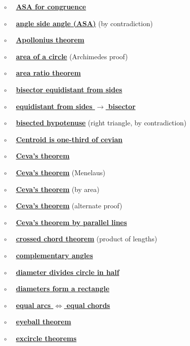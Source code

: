 \documentclass[11pt, oneside]{article}
\begin{document}
$\circ$ \ \ \hyperref[sec:ASA]{\textbf{ASA for congruence}}

$\circ$ \ \ \hyperref[sec:ASA_contradiction]{\textbf{angle side angle (ASA)}} (by contradiction)

$\circ$ \ \ \hyperref[sec:Apollonius_theorem]{\textbf{Apollonius theorem}}

$\circ$ \ \ \hyperref[sec:circle_area_Archimedes]{\textbf{area of a circle}} (Archimedes proof)

$\circ$ \ \ \hyperref[sec:area_ratio_theorem]{\textbf{area ratio theorem}}

$\circ$ \ \ \hyperref[sec:bisector_equidistant_sides]{\textbf{bisector equidistant from sides}}

$\circ$ \ \ \hyperref[sec:bisector_equidistant_sides_converse]{\textbf{equidistant from sides $\rightarrow$ bisector}}

$\circ$ \ \ \hyperref[sec:bisected_hypotenuse]{\textbf{bisected hypotenuse}} (right triangle, by contradiction)

$\circ$ \ \ \hyperref[sec:centroid_one_third]{\textbf{Centroid is one-third of cevian}}

$\circ$ \ \ \hyperref[sec:Ceva_theorem]{\textbf{Ceva's theorem}}

$\circ$ \ \ \hyperref[sec:ceva_by_menlaus]{\textbf{Ceva's theorem}} (Menelaus)

$\circ$ \ \ \hyperref[sec:ceva_by_area]{\textbf{Ceva's theorem}} (by area)

$\circ$ \ \ \hyperref[sec:ceva_alternate_proof]{\textbf{Ceva's theorem}} (alternate proof)

$\circ$ \ \ \hyperref[sec:ceva_parallel_lines]{\textbf{Ceva's theorem by parallel lines}}

$\circ$ \ \ \hyperref[sec:chord_segments]{\textbf{crossed chord theorem}} (product of lengths)

$\circ$ \ \ \hyperref[sec:complementary_angle_theorem]{\textbf{complementary angles}}

$\circ$ \ \ \hyperref[sec:diameter_of_a_circle]{\textbf{diameter divides circle in half}}

$\circ$ \ \ \hyperref[sec:diameters_form_rectangle]{\textbf{diameters form a rectangle}}

$\circ$ \ \ \hyperref[sec:equal_arcs_equal_chords]{\textbf{equal arcs $\iff$ equal chords}}

$\circ$ \ \ \hyperref[sec:eyeball_theorem]{\textbf{eyeball theorem}}

$\circ$ \ \ \hyperref[sec:excircle_theorems]{\textbf{excircle theorems}}
\end{document}
